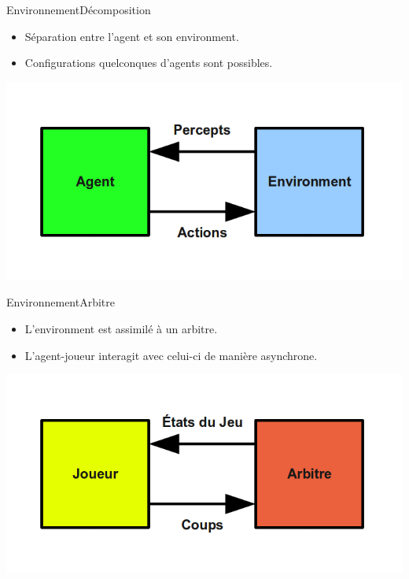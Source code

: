 
\begin{frame}{Environnement}{Décomposition}
\begin{itemize}
\item Séparation entre l'agent et son environment.
\item Configurations quelconques d'agents sont possibles.
\end{itemize}
\includegraphics[width=\textwidth]{img/env_sim/agent_env}\\
\end{frame}


\begin{frame}{Environnement}{Arbitre}
\begin{itemize}
\item L'environment est assimilé à un arbitre.
\item L'agent-joueur interagit avec celui-ci de manière asynchrone.
\end{itemize}
\includegraphics[width=\textwidth]{img/env_sim/agent_arb}\\
\end{frame}


